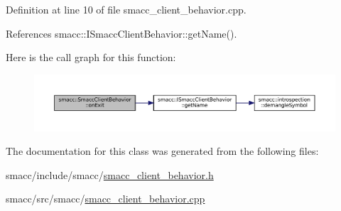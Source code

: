 Definition at line 10 of file smacc\+\_\+client\+\_\+behavior.\+cpp.



References smacc\+::\+I\+Smacc\+Client\+Behavior\+::get\+Name().


Here is the call graph for this function\+:
\nopagebreak
\begin{figure}[H]
\begin{center}
\leavevmode
\includegraphics[width=350pt]{classsmacc_1_1SmaccClientBehavior_a7e4fb6ce81ff96dc172425852d69c0c5_cgraph}
\end{center}
\end{figure}


The documentation for this class was generated from the following files\+:\begin{DoxyCompactItemize}
\item 
smacc/include/smacc/\hyperlink{smacc__client__behavior_8h}{smacc\+\_\+client\+\_\+behavior.\+h}\item 
smacc/src/smacc/\hyperlink{smacc__client__behavior_8cpp}{smacc\+\_\+client\+\_\+behavior.\+cpp}\end{DoxyCompactItemize}
